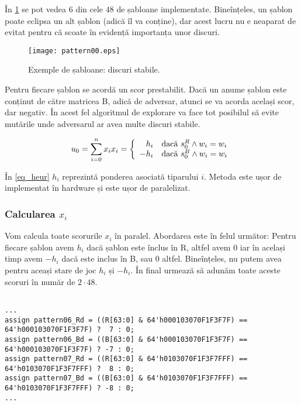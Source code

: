\documentclass[12pt,twoside,a4paper,fleqn]{book}
\theoremstyle{definition}
\begin{document}
În \ref{fig:sablon1} se pot vedea $6$ din cele $48$ de șabloane implementate. Bineînțeles, un șablon poate eclipsa un alt șablon (adică îl va conține), dar acest lucru nu e neaparat de evitat pentru că scoate în evidență importanța unor discuri.
\begin{figure}[h]
\begin{center}
\texttt{[image: pattern00.eps]}
\caption{\small{Exemple de șabloane: discuri stabile.}}
\label{fig:sablon1}
\end{center}
\end{figure}
Pentru fiecare șablon se acordă un scor prestabilit. Dacă un anume șablon este conținut de către matricea B, adică de adversar, atunci se va acorda același scor, dar negativ. În acest fel algoritmul de explorare va face tot posibilul să evite mutările unde adversarul ar avea multe discuri stabile.

\begin{equation}
\label{eq_heur}
u_{0} = \sum_{i=0}^{n} x_{i}\\
x_{i} = \left\{
\begin{array}{rl}
h_{i}      & \text{dacă } s_{0}^R \land w_{i} = w_{i}\\
-h_{i}     & \text{dacă } s_{0}^B \land w_{i} = w_{i}
\end{array} \right.
\end{equation}

În \eqref{eq_heur} $h_{i}$ reprezintă ponderea asociată tiparului $i$. Metoda este ușor de implementat în hardware și este ușor de paralelizat.
\subsubsection{Calcularea $x_{i}$}
Vom calcula toate scorurile $x_{i}$ în paralel. Abordarea este în felul următor: Pentru fiecare șablon avem $h_{i}$ dacă șablon este înclus în R, altfel avem $0$ iar în același timp avem $-h_{i}$ dacă este inclus în B, sau $0$ altfel. Bineînțeles, nu putem avea pentru aceași stare de joc $h_{i}$ și $-h_{i}$. În final urmează să adunăm toate aceste scoruri în număr de $2\cdot 48$.

\begin{fragmentsursa}
\begin{scriptsize}
\begin{verbatim}

...
assign pattern06_Rd = ((R[63:0] & 64'h000103070F1F3F7F) == 64'h000103070F1F3F7F) ?  7 : 0;
assign pattern06_Bd = ((B[63:0] & 64'h000103070F1F3F7F) == 64'h000103070F1F3F7F) ? -7 : 0;
assign pattern07_Rd = ((R[63:0] & 64'h0103070F1F3F7FFF) == 64'h0103070F1F3F7FFF) ?  8 : 0;
assign pattern07_Bd = ((B[63:0] & 64'h0103070F1F3F7FFF) == 64'h0103070F1F3F7FFF) ? -8 : 0;
...
\end{verbatim}
\end{scriptsize}
\caption{Exemplu de potrivire de șabloane.}
\label{frag_sablon1}
\end{fragmentsursa}
\end{document}
